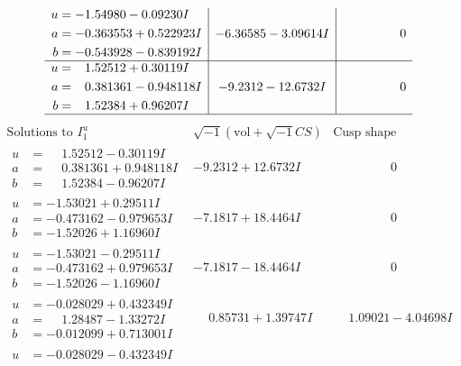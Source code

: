 \documentclass[1p]{elsarticle_modified}
\theoremstyle{definition}
\newcommand{\I}{\sqrt{-1}}
\begin{document}
$$\begin{array}{c|c|c}
\begin{aligned}
u &= -1.54980 - 0.09230 I \\
a &= -0.363553 + 0.522923 I \\
b &= -0.543928 - 0.839192 I\end{aligned}
 & -6.36585 - 3.09614 I & \phantom{-0.000000 } 0 \\ \hline\begin{aligned}
u &= \phantom{-}1.52512 + 0.30119 I \\
a &= \phantom{-}0.381361 - 0.948118 I \\
b &= \phantom{-}1.52384 + 0.96207 I\end{aligned}
 & -9.2312 - 12.6732 I & \phantom{-0.000000 } 0\\
 \hline 
 \end{array}$$\newpage$$\begin{array}{c|c|c}  
\text{Solutions to }I^u_{1}& \I (\text{vol} + \sqrt{-1}CS) & \text{Cusp shape}\\
 \hline 
\begin{aligned}
u &= \phantom{-}1.52512 - 0.30119 I \\
a &= \phantom{-}0.381361 + 0.948118 I \\
b &= \phantom{-}1.52384 - 0.96207 I\end{aligned}
 & -9.2312 + 12.6732 I & \phantom{-0.000000 } 0 \\ \hline\begin{aligned}
u &= -1.53021 + 0.29511 I \\
a &= -0.473162 - 0.979653 I \\
b &= -1.52026 + 1.16960 I\end{aligned}
 & -7.1817 + 18.4464 I & \phantom{-0.000000 } 0 \\ \hline\begin{aligned}
u &= -1.53021 - 0.29511 I \\
a &= -0.473162 + 0.979653 I \\
b &= -1.52026 - 1.16960 I\end{aligned}
 & -7.1817 - 18.4464 I & \phantom{-0.000000 } 0 \\ \hline\begin{aligned}
u &= -0.028029 + 0.432349 I \\
a &= \phantom{-}1.28487 - 1.33272 I \\
b &= -0.012099 + 0.713001 I\end{aligned}
 & \phantom{-}0.85731 + 1.39747 I & \phantom{-}1.09021 - 4.04698 I \\ \hline\begin{aligned}
u &= -0.028029 - 0.432349 I \\

\end{aligned}
\end{array}$$
\end{document}
